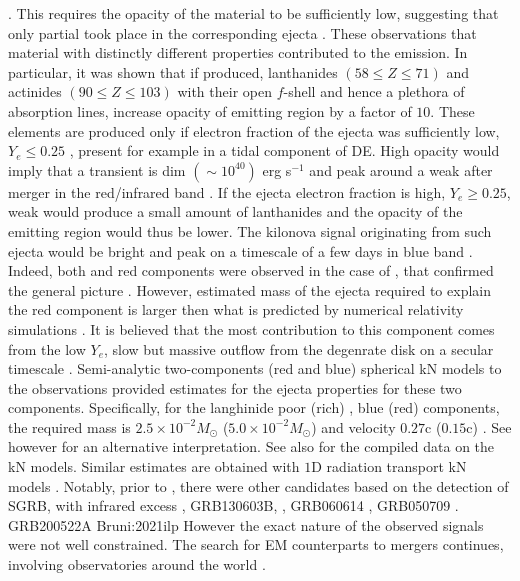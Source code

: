 \citep{Nicholl:2017ahq}. This requires the opacity of the material to be sufficiently low, 
suggesting that only partial \rproc{} \nuc{} took place in the corresponding ejecta 
\citep{Martin:2015hxa}.
%
These observations that material with distinctly different properties contributed to the emission.
%
In particular, it was shown that if produced, 
lanthanides $(58\leq Z \leq71)$ and actinides $(90\leq Z \leq 103)$ with their open $f$-shell 
and hence a plethora of absorption lines, increase opacity of emitting region by a factor of $10$. 
%
These elements are produced only if electron fraction of the ejecta was sufficiently low, 
$Y_e\leq 0.25$ \citep{Lippuner:2015gwa}, present for example in a tidal component of \ac{DE}. 
High opacity would imply that a transient is dim $(\sim10^{40})$ erg s$^{-1}$ and peak around a 
weak after merger in the red/infrared band \citep{Barnes:2013wka,Grossman:2013lqa,Lippuner:2015gwa}. 
%
If the ejecta electron fraction is high, $Y_e \geq 0.25$, weak \rproc{} would produce a small amount 
of lanthanides and the opacity of the emitting region would thus be lower. The kilonova signal originating 
from such ejecta would be bright and peak on a timescale of a few days in blue band 
\citep{Kasen:2014toa,Martin:2015hxa}. 
%
%
Indeed, both and red components were observed in the case of \AT{}, that confirmed the general 
picture \citep[\eg][]{Villar:2017wcc}. However, estimated mass of the ejecta required to explain 
the red component is larger then what is predicted by numerical relativity simulations . 
It is believed that the most contribution to this component comes from the low $Y_e$, slow but 
massive outflow from the degenrate disk on a secular timescale .
%
Semi-analytic two-components (red and blue) spherical \ac{kN} models to the \AT{} observations 
provided estimates for the ejecta properties for these two components. 
%
Specifically, for the langhinide poor (rich) \ie, blue (red) components, the required mass is 
$2.5\times10^{-2}M_{\odot}$ ($5.0\times10^{-2}M_{\odot}$) and velocity $0.27$c ($0.15$c)
\citep{Cowperthwaite:2017dyu,Villar:2017wcc}. 
See however \citep{Waxman:2017sqv} for an alternative interpretation.
See also \citep{Siegel:2019mlp} for the compiled data on the \ac{kN} models.
%
Similar estimates are obtained with $1$D radiation transport \ac{kN} models
\citep{Tanvir:2017pws,Tanaka:2017qxj}.
%
% 
Notably, prior to \AT{}, there were other candidates based on the detection of \ac{SGRB}, 
with infrared excess \eg, 
GRB130603B, \citep{Berger:2013wna,Tanvir:2013pia}, 
GRB060614 \citep{Jin:2015txa,Yang:2015pha}, 
GRB050709 \citep{Jin:2016pnm}.
GRB200522A \citep{WRONG}  Bruni:2021ilp
However the exact nature of the observed signals were not well constrained. 
%
The search for \ac{EM} counterparts to mergers continues, involving observatories around the world 
\citep{Law:2009,Singer:2014qca,Bellm:2014,Kasliwal:2016uhu}.
%



